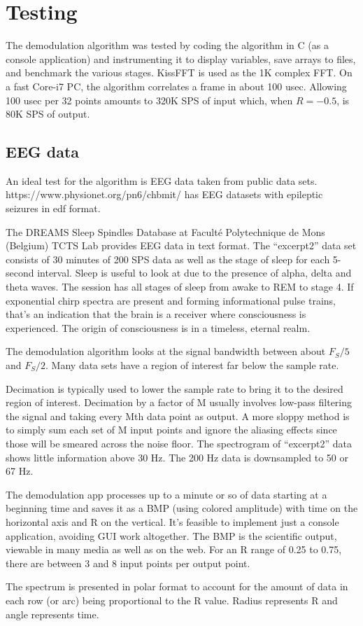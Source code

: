 \section{Testing}

The demodulation algorithm was tested by coding the algorithm in C (as a console
application) and instrumenting it to display variables,
save arrays to files, and benchmark the various stages.
KissFFT is used as the 1K complex FFT.
On a fast Core-i7 PC, the algorithm correlates a frame in about 100 usec.
Allowing 100 usec per 32 points amounts to 320K SPS of input which, when $R=-0.5$,
is 80K SPS of output.

\subsection{EEG data}

An ideal test for the algorithm is EEG data taken from public data sets.
https://www.physionet.org/pn6/chbmit/ has EEG datasets with epileptic seizures
in edf format.

The DREAMS Sleep Spindles Database at Facult\'e Polytechnique de Mons (Belgium)
TCTS Lab \cite{Devuyst} provides EEG data in text format. 
The ``excerpt2'' data set consists of 30 minutes of 200 SPS data as well as the
stage of sleep for each 5-second interval.
Sleep is useful to look at due to the presence of alpha, delta and theta waves. 
The session has all stages of sleep from awake to REM to stage 4.
If exponential chirp spectra are present and forming informational pulse trains,
that's an indication that the brain is a receiver where consciousness is
experienced. The origin of consciousness is in a timeless, eternal realm.

The demodulation algorithm looks at the signal bandwidth between about
$F_S/5$ and $F_S/2$.
Many data sets have a region of interest far below the sample rate.

Decimation is typically used to lower the sample rate to bring it to the
desired region of interest. 
Decimation by a factor of M usually involves low-pass filtering the signal
and taking every Mth data point as output.
A more sloppy method is to simply sum each set of M input points and ignore
the aliasing effects since those will be smeared across the noise floor.
The spectrogram of ``excerpt2'' data shows little information above 30 Hz.
The 200 Hz data is downsampled to 50 or 67 Hz.

The demodulation app processes up to a minute or so of data starting at a 
beginning time and saves it as a BMP (using colored amplitude) with time on the
horizontal axis and R on the vertical.
It's feasible to implement just a console application,
avoiding GUI work altogether.
The BMP is the scientific output, viewable in many media as well as on the web.
For an R range of 0.25 to 0.75, there are between 3 and 8 input points per 
output point. 

The spectrum is presented in polar format to account for the amount of data in
each row (or arc) being proportional to the R value.
Radius represents R and angle represents time.

